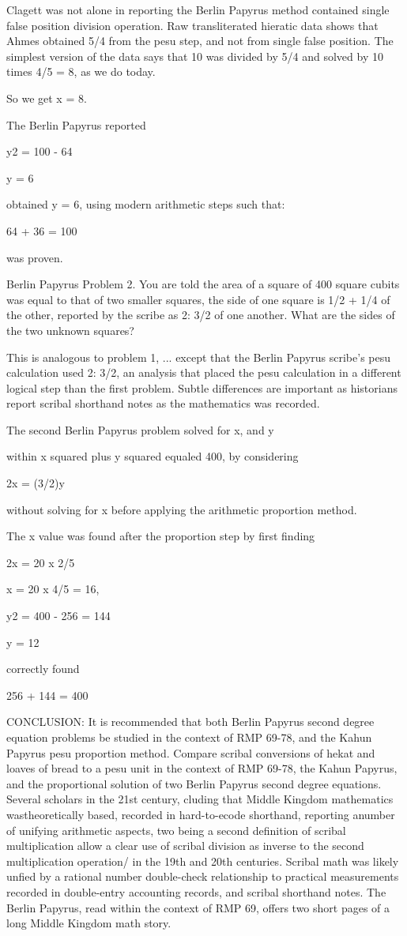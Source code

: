 \documentclass[12pt]{article}
\begin{document}
Clagett was not alone in reporting the Berlin Papyrus method contained single false position division operation. Raw transliterated hieratic data shows that Ahmes obtained 5/4 from the pesu step, and not from single false position. The simplest version of the data says that 10 was divided by 5/4 and solved by 10 times 4/5 = 8, as we do today.

So we get x = 8.

The Berlin Papyrus reported

y2 = 100 - 64

y = 6 

obtained y = 6, using modern arithmetic steps such that:

64 + 36 = 100

was proven.

Berlin Papyrus Problem 2. You are told the area of a square of 400 square cubits was equal to that of two smaller squares, the side of one square is 1/2 + 1/4 of the other, reported by the scribe as 2: 3/2 of one another. What are the sides of the two unknown squares?

This is analogous to problem 1, ... except that the Berlin Papyrus scribe's pesu calculation used 2: 3/2, an analysis that placed the pesu calculation in a different logical step than the first problem. Subtle differences are important as historians report scribal shorthand notes as the mathematics was recorded.

The second Berlin Papyrus problem solved for x, and y

within x squared plus y squared equaled 400, by considering

2x = (3/2)y

without solving for x before applying the arithmetic proportion method.

The x value was found after the proportion step by first finding

2x = 20 x 2/5

x = 20 x 4/5 = 16,

y2 = 400 - 256 = 144

y = 12

correctly found

256 + 144 = 400

CONCLUSION: It is recommended that both Berlin Papyrus second degree equation problems be studied in the context of RMP 69-78, and the Kahun Papyrus pesu proportion method. Compare scribal conversions of hekat and loaves of bread to a pesu unit in the context of RMP 69-78, the Kahun Papyrus, and the proportional solution of two Berlin Papyrus second degree equations. Several scholars in the 21st century, 
cluding that Middle Kingdom mathematics wastheoretically based, recorded in hard-to-ecode shorthand, reporting anumber of unifying arithmetic aspects, two being a second definition of scribal multiplication allow a clear use of scribal division as inverse to the second multiplication operation/ in the 19th and 20th centuries. Scribal math was likely
unfied by a rational number double-check relationship to practical measurements recorded in double-entry accounting records, and scribal shorthand notes. The Berlin Papyrus, read within the context of RMP 69, offers two short pages of a long Middle Kingdom math story.
\end{document}

